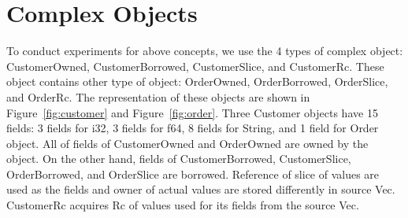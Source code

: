 \section{Complex Objects}
\label{sec:concept_compobj}
To conduct experiments for above concepts, we use the 4 types of complex object: CustomerOwned, CustomerBorrowed, CustomerSlice, and CustomerRc. 
These object contains other type of object: OrderOwned, OrderBorrowed, OrderSlice, and OrderRc.
The representation of these objects are shown in Figure~\ref{fig:customer} and Figure~\ref{fig:order}. 
Three Customer objects have 15 fields: 3 fields for i32, 3 fields for f64, 8 fields for String, and 1 field for Order object.
All of fields of CustomerOwned and OrderOwned are owned by the object. On the other hand, fields of CustomerBorrowed, CustomerSlice, OrderBorrowed, and OrderSlice are borrowed. 
Reference of slice of values are used as the fields and owner of actual values are stored differently in source Vec. 
CustomerRc acquires Rc of values used for its fields from the source Vec.

